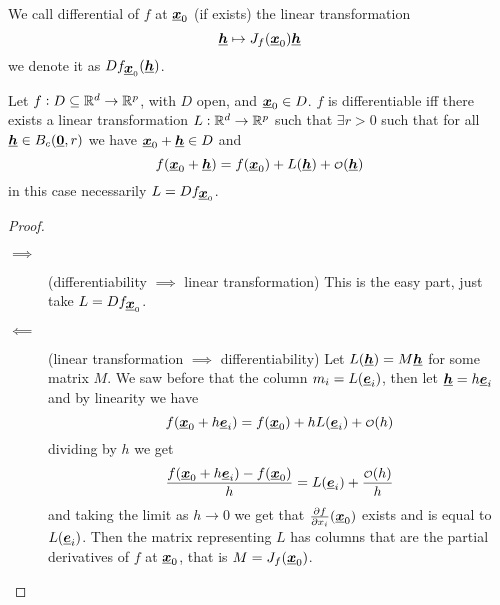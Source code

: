 \documentclass[12pt]{extarticle}
\renewcommand{\vec}[1]{\uvec{#1}}
\begin{document}
\begin{definition}[differential]
    We call differential of $f$ at $\vec{x}_0$ (if exists) the linear transformation
    \begin{equation}
        \vec{h} \mapsto J_f(\vec{x}_0) \vec{h}
    \end{equation}
    we denote it as $Df_{\vec{x}_0}(\vec{h})$.
\end{definition}

\begin{proposition}
    Let $f: D \subseteq \mathbb{R}^d \to \mathbb{R}^p$, with $D$ open, and $\vec{x}_0 \in D$.
    $f$ is differentiable iff there exists a linear transformation $L: \mathbb{R}^d \to \mathbb{R}^p$ such that $\exists r > 0$ such that for all $\vec{h} \in B_c(\vec{0}, r)$ we have $\vec{x}_0 + \vec{h} \in D$ and
    \begin{equation}
        f(\vec{x}_0 + \vec{h}) = f(\vec{x}_0) + L(\vec{h}) + \o(\vec{h})
    \end{equation}
    in this case necessarily $L = Df_{\vec{x}_0}$.
\end{proposition}

\begin{proof}
    \skiplineafterproof
    \begin{description}
        \item[$\implies$] (differentiability $\implies$ linear transformation)
              This is the easy part, just take $L = Df_{\vec{x}_0}$.
        \item[$\impliedby$] (linear transformation $\implies$ differentiability)
              Let $L(\vec{h}) = M \vec{h}$ for some matrix $M$.
              We saw before that the column $m_i = L(\vec{e}_i)$, then let $\vec{h} = h \vec{e}_i$ and by linearity we have
              \begin{equation}
                  f(\vec{x}_0 + h \vec{e}_i) = f(\vec{x}_0) + h L(\vec{e}_i) + \o(h)
              \end{equation}
              dividing by $h$ we get
              \begin{equation}
                  \frac{f(\vec{x}_0 + h \vec{e}_i) - f(\vec{x}_0)}{h} = L(\vec{e}_i) + \frac{\o(h)}{h}
              \end{equation}
              and taking the limit as $h \to 0$ we get that $\pdv{f}{x_i}\/(\vec{x}_0)$ exists and is equal to $L(\vec{e}_i)$.
              Then the matrix representing $L$ has columns that are the partial derivatives of $f$ at $\vec{x}_0$, that is $M = J_f(\vec{x}_0)$.
    \end{description}
\end{proof}
\end{document}
